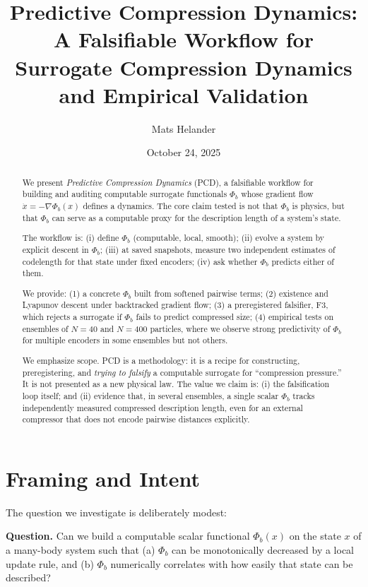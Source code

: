 \documentclass[11pt,a4paper]{article}
\title{\bf Predictive Compression Dynamics:\\
A Falsifiable Workflow for Surrogate Compression Dynamics and Empirical Validation}
\author{Mats Helander}
\date{October 24, 2025}
\numberwithin{equation}{section}
\newcommand{\phib}{\Phi_b}
\begin{document}
\maketitle

\begin{abstract}
We present \emph{Predictive Compression Dynamics} (PCD), a falsifiable workflow for building and auditing computable surrogate functionals $\phib$ whose gradient flow $\dot x = -\nabla \phib(x)$ defines a dynamics. The core claim tested is not that $\phib$ is physics, but that $\phib$ can serve as a computable proxy for the description length of a system's state.

The workflow is: (i) define $\phib$ (computable, local, smooth); (ii) evolve a system by explicit descent in $\phib$; (iii) at saved snapshots, measure two independent estimates of codelength for that state under fixed encoders; (iv) ask whether $\phib$ predicts either of them.

We provide: (1) a concrete $\phib$ built from softened pairwise terms; (2) existence and Lyapunov descent under backtracked gradient flow; (3) a preregistered falsifier, F3, which rejects a surrogate if $\phib$ fails to predict compressed size; (4) empirical tests on ensembles of $N{=}40$ and $N{=}400$ particles, where we observe strong predictivity of $\phib$ for multiple encoders in some ensembles but not others.

We emphasize scope. PCD is a methodology: it is a recipe for constructing, preregistering, and \emph{trying to falsify} a computable surrogate for ``compression pressure.'' It is not presented as a new physical law. The value we claim is: (i) the falsification loop itself; and (ii) evidence that, in several ensembles, a single scalar $\phib$ tracks independently measured compressed description length, even for an external compressor that does not encode pairwise distances explicitly.
\end{abstract}

\section{Framing and Intent}
The question we investigate is deliberately modest:

\medskip
\noindent
\textbf{Question.} Can we build a computable scalar functional $\phib(x)$ on the state $x$ of a many-body system such that (a) $\phib$ can be monotonically decreased by a local update rule, and (b) $\phib$ numerically correlates with how easily that state can be described?
\end{document}
